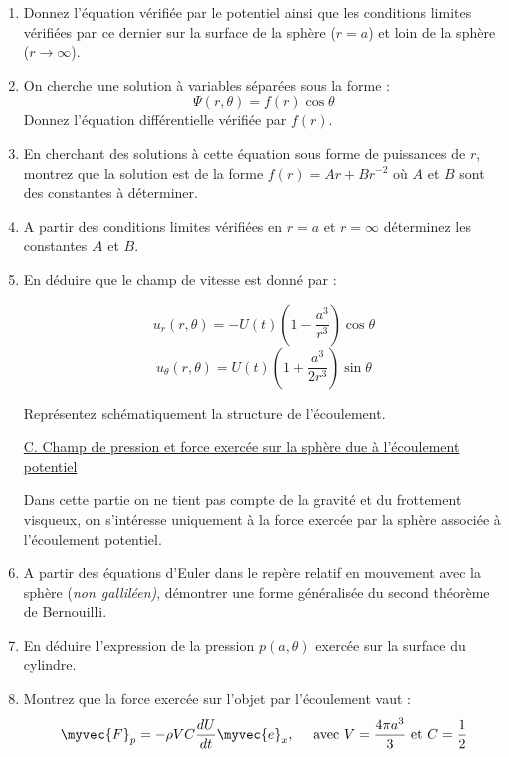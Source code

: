 \begin{enumerate}
\item Donnez l'équation vérifiée par le potentiel ainsi que les conditions limites vérifiées par ce dernier sur la surface de la sphère ($r=a$) et loin de la sphère ($r \rightarrow \infty$).

\item On cherche une solution à variables séparées sous la forme :
$$
\Psi(r,\theta) =  f(r) \cos \theta
$$
Donnez l'équation différentielle vérifiée par $f(r)$. 

\item En cherchant des solutions à cette équation sous forme de puissances de $r$, 
montrez que la solution est de la forme $f(r) = A r + B r^{-2}$ où $A$ et $B$ sont des constantes à déterminer.

\item A partir des conditions limites vérifiées en $r=a$ et $r= \infty$ déterminez les constantes $A$ et $B$.

\item En déduire que le champ de vitesse est donné par :

$$
u_r(r,\theta)= -U(t) \left( 1 - \frac{a^3}{r^3} \right) \cos \theta
$$ 
$$
u_\theta(r,\theta)
 = U(t) \left( 1 + \frac{a^3}{2r^3} \right) \sin \theta
 $$

Représentez schématiquement la structure de l'écoulement.

\underline{C. Champ de pression et force exercée sur la sphère due à l'écoulement potentiel}

Dans cette partie on ne tient pas compte de la gravité et du frottement visqueux, on s'intéresse uniquement à la force exercée par la sphère associée à l'écoulement potentiel.


\item A partir des équations d'Euler dans le repère relatif en mouvement avec la sphère ({\em non galliléen)}, démontrer une forme généralisée du second théorème de Bernouilli.

\item En déduire l'expression de la pression $p(a,\theta)$ exercée sur la surface du cylindre. 

\item Montrez que la force exercée sur l'objet par l'écoulement vaut :
$$
\myvec{F}_p = - \rho V C  \frac{ dU}{dt} \myvec{e}_x  , \quad \mbox{ avec } V = \frac{4 \pi a^3}{3} \mbox{ et } 
C = \frac{1}{2}
$$


\end{enumerate}
